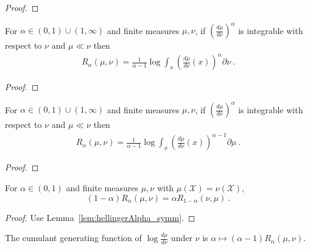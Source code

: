 \begin{proof}\leanok
{}
\end{proof}


\begin{lemma}
  \label{lem:renyi_eq_log_integral}
  For $\alpha \in (0,1)\cup(1, \infty)$ and finite measures $\mu, \nu$, if 
  $\left(\frac{d \mu}{d \nu}\right)^\alpha$ is integrable with respect to $\nu$ and $\mu \ll \nu$ then
  \begin{align*}
  R_\alpha(\mu, \nu) = \frac{1}{\alpha - 1} \log \int_x \left(\frac{d \mu}{d \nu}(x)\right)^\alpha \partial \nu
  \: .
  \end{align*}
\end{lemma}

\begin{proof}%
{}
\end{proof}


\begin{lemma}
  \label{lem:renyi_eq_log_integral'}
  For $\alpha \in (0,1)\cup(1, \infty)$ and finite measures $\mu, \nu$, if 
  $\left(\frac{d \mu}{d \nu}\right)^\alpha$ is integrable with respect to $\nu$ and $\mu \ll \nu$ then
  \begin{align*}
  R_\alpha(\mu, \nu) = \frac{1}{\alpha - 1} \log \int_x \left(\frac{d \mu}{d \nu}(x)\right)^{\alpha - 1} \partial \mu
  \: .
  \end{align*}
\end{lemma}

\begin{proof}%
{}
\end{proof}


\begin{lemma}
  \label{lem:renyi_symm}
  For $\alpha \in (0, 1)$ and finite measures $\mu, \nu$ with $\mu(\mathcal X) = \nu(\mathcal X)$, 
  \[(1 - \alpha) R_\alpha(\mu, \nu) = \alpha R_{1 - \alpha}(\nu, \mu) \: .\]
\end{lemma}

\begin{proof}%
{}
Use Lemma~\ref{lem:hellingerAlpha_symm}.
\end{proof}


\begin{lemma}
  \label{lem:renyi_cgf}
  The cumulant generating function of $\log\frac{d\mu}{d\nu}$ under $\nu$ is $\alpha \mapsto (\alpha - 1) R_\alpha(\mu, \nu)$.
\end{lemma}

